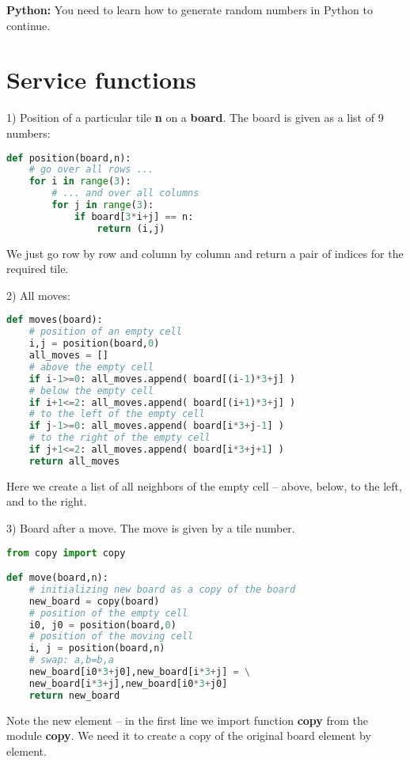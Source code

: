 \begin{tcolorbox}
\textbf{Python:}
You need to learn how to generate random numbers
in Python to continue.
\end{tcolorbox}

\section{Service functions}
1) Position of a particular tile \textbf{n} on a \textbf{board}. The
board is given as a list of 9 numbers:

\begin{lstlisting}[language=Python,style=codelst2,caption={Python: 8-puzzle, position of a tile}]
def position(board,n):
    # go over all rows ...
    for i in range(3):
        # ... and over all columns
        for j in range(3):
            if board[3*i+j] == n:
                return (i,j)
\end{lstlisting}
We just go row by row and column by column 
and return a pair of indices for the required tile.

2) All moves:

\begin{lstlisting}[language=Python,style=codelst2,caption={Python: 8-puzzle, all moves}]
def moves(board):
    # position of an empty cell
    i,j = position(board,0)
    all_moves = []
    # above the empty cell
    if i-1>=0: all_moves.append( board[(i-1)*3+j] )
    # below the empty cell
    if i+1<=2: all_moves.append( board[(i+1)*3+j] )
    # to the left of the empty cell
    if j-1>=0: all_moves.append( board[i*3+j-1] )
    # to the right of the empty cell
    if j+1<=2: all_moves.append( board[i*3+j+1] )
    return all_moves
\end{lstlisting}
Here we create a list of all neighbors of the empty cell -- above,
below, to the left, and to the right.

3) Board after a move. The move is given by a tile number.

\begin{lstlisting}[language=Python,style=codelst2,caption={Python: 8-puzzle, making a move, returning new board}]
from copy import copy

def move(board,n):
    # initializing new board as a copy of the board
    new_board = copy(board)
    # position of the empty cell
    i0, j0 = position(board,0)
    # position of the moving cell
    i, j = position(board,n)
    # swap: a,b=b,a
    new_board[i0*3+j0],new_board[i*3+j] = \
    new_board[i*3+j],new_board[i0*3+j0]
    return new_board
\end{lstlisting}
Note the new element -- in the first line we import function 
\textbf{copy} from the module \textbf{copy}. We need it to
create a copy of the original board element by element.

